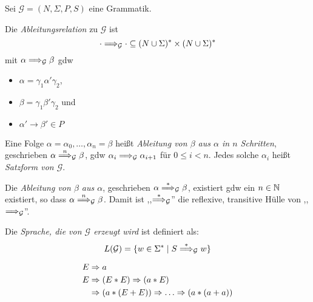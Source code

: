 \begin{Def}
  Sei $\mathcal{G} =(N,\Sigma,P,S)$ eine Grammatik.

	Die \emph{Ableitungsrelation} zu $\mathcal{G}$ ist 
  \begin{displaymath}
    \cdot \==>_\mathcal{G} \cdot \subseteq (N\cup\Sigma)^*\x(N\cup\Sigma)^*
  \end{displaymath}
  mit $\alpha \==>_\mathcal{G} \beta$ gdw 
  \begin{itemize}
  \item $\alpha = \gamma_1\alpha'\gamma_2$,
  \item $\beta = \gamma_1\beta'\gamma_2$ und
  \item $\alpha' \to \beta' \in P$
  \end{itemize}

  Eine Folge $\alpha = \alpha_0,\ldots,\alpha_n = \beta$ heißt \emph{Ableitung von $\beta$ aus $\alpha$ in $n$ Schritten}, geschrieben $\alpha \stackrel{n}{\==>}_\mathcal{G} \beta$, gdw $\alpha_i \==>_\mathcal{G} \alpha_{i+1}$ für $0 \le i < n$.
  Jedes solche $\alpha_i$ heißt \emph{Satzform von $\mathcal{G}$}.

  Die \emph{Ableitung von $\beta$ aus $\alpha$}, geschrieben $\alpha \stackrel{*}{\==>}_\mathcal{G} \beta$, existiert gdw ein $n \in \mathbb{N}$ existiert, so dass $\alpha \stackrel{n}{\==>}_\mathcal{G} \beta$.
  Damit ist ,,$\stackrel{*}{\==>}_\mathcal{G}$'' die reflexive, transitive Hülle von ,,$\==>_\mathcal{G}$''.

	Die \emph{Sprache, die von $\mathcal{G}$ erzeugt wird} ist definiert als:
	\[ L(\mathcal{G}) = \{w\in\Sigma^* \mid S \stackrel{*}{\==>}_{\mathcal{G}} w \}\]
	
\end{Def}


\begin{Bsp}
  \begin{align*}
		E &\=> a\\
		E &\=> (E*E) \=> (a*E)\\
		&\=> (a*(E+E)) \=> \dots \=> (a*(a+a))
  \end{align*}
\end{Bsp}

